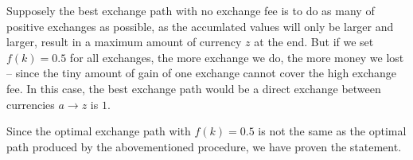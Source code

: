 \documentclass[11pt]{article}
\begin{document}
Supposely the best exchange path with no exchange fee is to do as many of positive exchanges as possible, as the accumlated values will only be larger and larger, result in a maximum amount of currency $z$ at the end. But if we set $f(k) = 0.5$ for all exchanges, the more exchange we do, the more money we lost -- since the tiny amount of gain of one exchange cannot cover the high exchange fee. In this case, the best exchange path would be a direct exchange between currencies $a \to z$ is $1$.

Since the optimal exchange path with $f(k) = 0.5$ is not the same as the optimal path produced by the abovementioned procedure, we have proven the statement.

%
% 
% 
\end{document}
